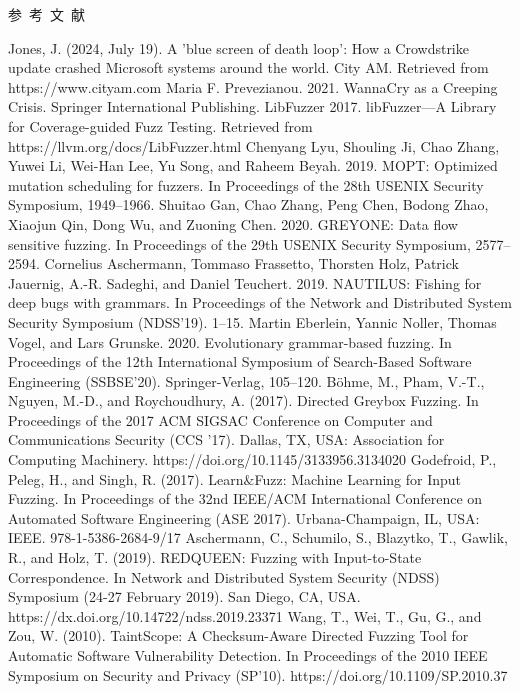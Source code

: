 \documentclass[10.5pt,compsoc]{CjC}
\theoremstyle{mystyle}
\begin{document}
\vspace {5mm}
\centerline
{
\heiti 参~考~文~献 }

\begin{thebibliography}{99}
\vspace{3mm}
  Jones, J. (2024, July 19). A 'blue screen of death loop': How a Crowdstrike update crashed Microsoft systems around the world. City AM. Retrieved from https://www.cityam.com
	 Maria F. Prevezianou. 2021. WannaCry as a Creeping Crisis. Springer International Publishing.
  LibFuzzer 2017. libFuzzer—A Library for Coverage-guided Fuzz Testing. Retrieved from https://llvm.org/docs/LibFuzzer.html
  Chenyang Lyu, Shouling Ji, Chao Zhang, Yuwei Li, Wei-Han Lee, Yu Song, and Raheem Beyah. 2019. MOPT: Optimized mutation scheduling for fuzzers. In Proceedings of the 28th USENIX Security Symposium, 1949–1966.
  Shuitao Gan, Chao Zhang, Peng Chen, Bodong Zhao, Xiaojun Qin, Dong Wu, and Zuoning Chen. 2020. GREYONE:
Data flow sensitive fuzzing. In Proceedings of the 29th USENIX Security Symposium, 2577–2594.
  Cornelius Aschermann, Tommaso Frassetto, Thorsten Holz, Patrick Jauernig, A.-R. Sadeghi, and Daniel Teuchert. 2019. NAUTILUS: Fishing for deep bugs with grammars. In Proceedings of the Network and Distributed System Security
Symposium (NDSS’19). 1–15.
  Martin Eberlein, Yannic Noller, Thomas Vogel, and Lars Grunske. 2020. Evolutionary grammar-based fuzzing. In Proceedings of the 12th International Symposium of Search-Based Software Engineering (SSBSE’20). Springer-Verlag, 105–120.
  Böhme, M., Pham, V.-T., Nguyen, M.-D., and Roychoudhury, A. (2017). Directed Greybox Fuzzing. In Proceedings of the 2017 ACM SIGSAC Conference on Computer and Communications Security (CCS ’17). Dallas, TX, USA: Association for Computing Machinery. https://doi.org/10.1145/3133956.3134020
  Godefroid, P., Peleg, H., and Singh, R. (2017). Learn$\&$Fuzz: Machine Learning for Input Fuzzing. In Proceedings of the 32nd IEEE/ACM International Conference on Automated Software Engineering (ASE 2017). Urbana-Champaign, IL, USA: IEEE. 978-1-5386-2684-9/17
  Aschermann, C., Schumilo, S., Blazytko, T., Gawlik, R., and Holz, T. (2019). REDQUEEN: Fuzzing with Input-to-State Correspondence. In Network and Distributed System Security (NDSS) Symposium (24-27 February 2019). San Diego, CA, USA. https://dx.doi.org/10.14722/ndss.2019.23371
  Wang, T., Wei, T., Gu, G., and Zou, W. (2010). TaintScope: A Checksum-Aware Directed Fuzzing Tool for Automatic Software Vulnerability Detection. In Proceedings of the 2010 IEEE Symposium on Security and Privacy (SP'10). https://doi.org/10.1109/SP.2010.37

\end{thebibliography}
\end{document}
